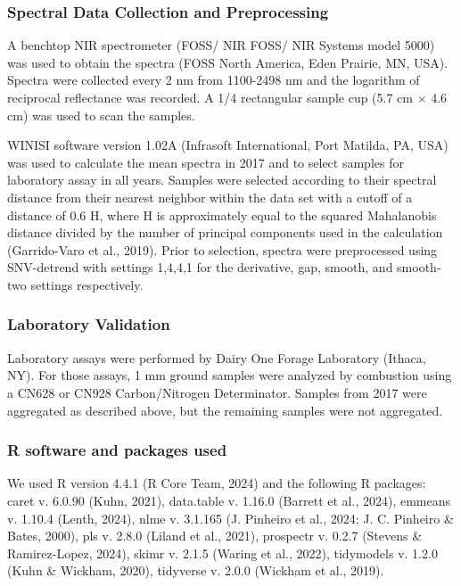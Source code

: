 \documentclass[
]{agujournal2019}
\begin{document}
\subsubsection{Spectral Data Collection and
Preprocessing}\label{spectral-data-collection-and-preprocessing}

A benchtop NIR spectrometer (FOSS/ NIR FOSS/ NIR Systems model 5000) was
used to obtain the spectra (FOSS North America, Eden Prairie, MN, USA).
Spectra were collected every 2 nm from 1100-2498 nm and the logarithm of
reciprocal reflectance was recorded. A 1/4 rectangular sample cup (5.7
cm × 4.6 cm) was used to scan the samples.

WINISI software version 1.02A (Infrasoft International, Port Matilda,
PA, USA) was used to calculate the mean spectra in 2017 and to select
samples for laboratory assay in all years. Samples were selected
according to their spectral distance from their nearest neighbor within
the data set with a cutoff of a distance of 0.6 H, where H is
approximately equal to the squared Mahalanobis distance divided by the
number of principal components used in the calculation (Garrido-Varo et
al., 2019). Prior to selection, spectra were preprocessed using
SNV-detrend with settings 1,4,4,1 for the derivative, gap, smooth, and
smooth-two settings respectively.

\subsubsection{Laboratory Validation}\label{laboratory-validation}

Laboratory assays were performed by Dairy One Forage Laboratory (Ithaca,
NY). For those assays, 1 mm ground samples were analyzed by combustion
using a CN628 or CN928 Carbon/Nitrogen Determinator. Samples from 2017
were aggregated as described above, but the remaining samples were not
aggregated.

\subsubsection{R software and packages
used}\label{r-software-and-packages-used}

We used R version 4.4.1 (R Core Team, 2024) and the following R
packages: caret v. 6.0.90 (Kuhn, 2021), data.table v. 1.16.0 (Barrett et
al., 2024), emmeans v. 1.10.4 (Lenth, 2024), nlme v. 3.1.165 (J.
Pinheiro et al., 2024; J. C. Pinheiro \& Bates, 2000), pls v. 2.8.0
(Liland et al., 2021), prospectr v. 0.2.7 (Stevens \& Ramirez-Lopez,
2024), skimr v. 2.1.5 (Waring et al., 2022), tidymodels v. 1.2.0 (Kuhn
\& Wickham, 2020), tidyverse v. 2.0.0 (Wickham et al., 2019).
\end{document}
